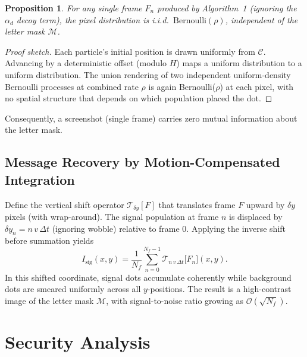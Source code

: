 \documentclass[12pt,a4paper]{article}
\newtheorem{proposition}{Proposition}
\begin{document}
\begin{proposition}
\label{prop:uninformative}
For any single frame $F_n$ produced by Algorithm~1 (ignoring the
$\alpha_d$ decoy term), the pixel distribution is i.i.d.\
$\mathrm{Bernoulli}(\rho)$, independent of the letter mask $\mathcal{M}$.
\end{proposition}

\begin{proof}[Proof sketch]
Each particle's initial position is drawn uniformly from $\mathcal{C}$.
Advancing by a deterministic offset (modulo $H$) maps a uniform distribution
to a uniform distribution.  The union rendering of two independent
uniform-density Bernoulli processes at combined rate $\rho$ is again
Bernoulli($\rho$) at each pixel, with no spatial structure that depends on
which population placed the dot.
\end{proof}

Consequently, a screenshot (single frame) carries zero mutual information
about the letter mask.

\subsection{Message Recovery by Motion-Compensated Integration}
\label{sec:recovery}

Define the vertical shift operator $\mathcal{T}_{\delta y}[F]$ that
translates frame $F$ upward by $\delta y$ pixels (with wrap-around).
The signal population at frame $n$ is displaced by
$\delta y_n = n\,v\,\Delta t$ (ignoring wobble) relative to frame $0$.
Applying the inverse shift before summation yields
\begin{equation}
  I_{\mathrm{sig}}(x, y)
  = \frac{1}{N_f} \sum_{n=0}^{N_f-1}
      \mathcal{T}_{n\,v\,\Delta t}\!\bigl[F_n\bigr](x, y).
\end{equation}
In this shifted coordinate, signal dots accumulate coherently while
background dots are smeared uniformly across all $y$-positions.  The
result is a high-contrast image of the letter mask $\mathcal{M}$, with
signal-to-noise ratio growing as $\mathcal{O}(\sqrt{N_f})$.

\section{Security Analysis}
\label{sec:security}
\end{document}

